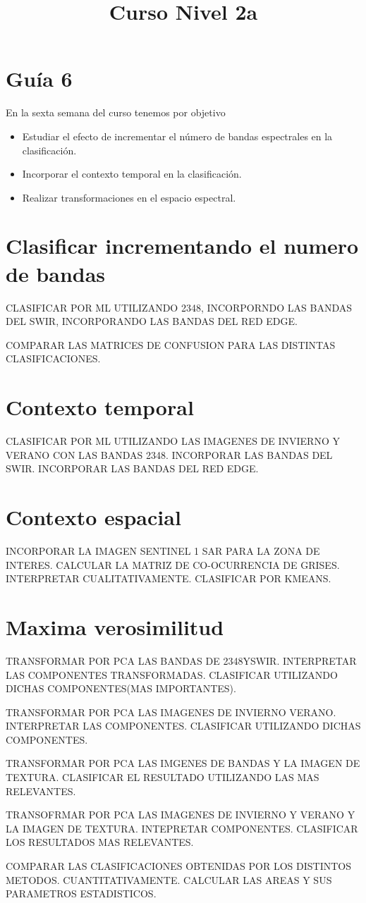 \documentclass[a4paper]{article}
\title{Curso Nivel 2a}
\begin{document}
\section{Guía 6}
En la sexta semana del curso tenemos por objetivo
\begin{itemize}
    \item Estudiar el efecto de incrementar el número de bandas espectrales en la clasificación.
    \item Incorporar el contexto temporal en la clasificación.
    \item Realizar transformaciones en el espacio espectral.
\end{itemize}

\section{Clasificar incrementando el numero de bandas}
CLASIFICAR POR ML UTILIZANDO 2348, INCORPORNDO LAS BANDAS DEL SWIR, INCORPORANDO LAS BANDAS DEL RED EDGE.

COMPARAR LAS MATRICES DE CONFUSION PARA LAS DISTINTAS CLASIFICACIONES.

\section{Contexto temporal}
CLASIFICAR POR ML UTILIZANDO LAS IMAGENES DE INVIERNO Y VERANO CON LAS BANDAS 2348. INCORPORAR LAS BANDAS DEL SWIR. INCORPORAR LAS BANDAS DEL RED EDGE.

\section{Contexto espacial}
INCORPORAR LA IMAGEN SENTINEL 1 SAR PARA LA ZONA DE INTERES. CALCULAR LA MATRIZ DE CO-OCURRENCIA DE GRISES. INTERPRETAR CUALITATIVAMENTE. CLASIFICAR POR KMEANS.

\section{Maxima verosimilitud}
TRANSFORMAR POR PCA LAS BANDAS DE 2348YSWIR. INTERPRETAR LAS COMPONENTES TRANSFORMADAS. CLASIFICAR UTILIZANDO DICHAS COMPONENTES(MAS IMPORTANTES).

TRANSFORMAR POR PCA LAS IMAGENES DE INVIERNO VERANO. INTERPRETAR LAS COMPONENTES. CLASIFICAR UTILIZANDO DICHAS COMPONENTES.

TRANSFORMAR POR PCA LAS IMGENES DE BANDAS Y LA IMAGEN DE TEXTURA. CLASIFICAR EL RESULTADO UTILIZANDO LAS MAS RELEVANTES.

TRANSOFRMAR POR PCA LAS IMAGENES DE INVIERNO Y VERANO Y LA IMAGEN DE TEXTURA. INTEPRETAR COMPONENTES. CLASIFICAR LOS RESULTADOS MAS RELEVANTES.

COMPARAR LAS CLASIFICACIONES OBTENIDAS POR LOS DISTINTOS METODOS. CUANTITATIVAMENTE. CALCULAR LAS AREAS Y SUS PARAMETROS ESTADISTICOS.
\end{document}
